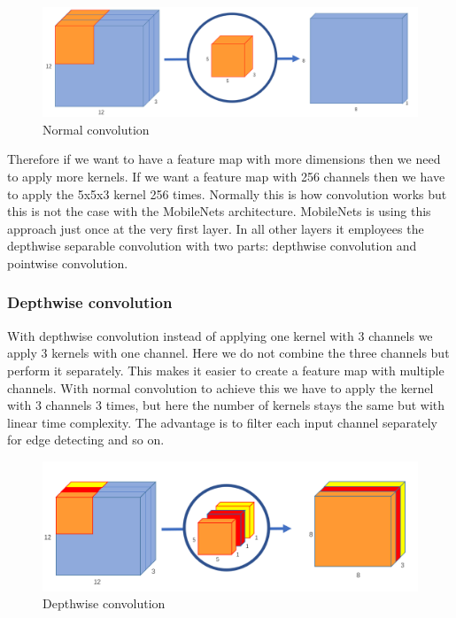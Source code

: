 \begin{figure}[!htb]
    \centering
    \includegraphics[width=1\textwidth]{figures/normalconvolution2.png}
    \caption{Normal convolution}
    \label{fig:normconv}
\end{figure}

Therefore if we want to have a feature map with more dimensions then we need to apply more kernels. If we want a feature map with 256 channels then we have to apply the 5x5x3 kernel 256 times. Normally this is how convolution works but this is not the case with the MobileNets architecture. MobileNets is using this approach just once at the very first layer. In all other layers it employees the depthwise separable convolution with two parts: depthwise convolution and pointwise convolution. 



\subsubsection{Depthwise convolution}
 

With depthwise convolution instead of applying one kernel with 3 channels we apply 3 kernels with one channel. Here we do not combine the three channels but perform it separately. This makes it easier to create a feature map with multiple channels. With normal convolution to achieve this we have to apply the kernel with 3 channels 3 times, but here the number of kernels stays the same but with linear time complexity. 
The advantage is to filter each input channel separately for edge detecting and so on. 



\begin{figure}[!htb]
    \centering
    \includegraphics[width=1\textwidth]{figures/depthwise2.png}
    \caption{Depthwise convolution}
    \label{fig:depthconv}
\end{figure}

